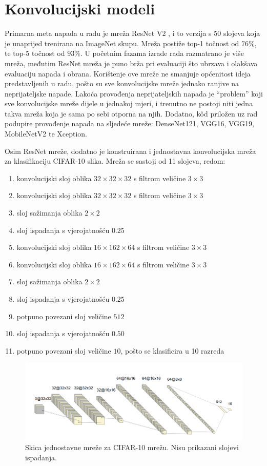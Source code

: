 \documentclass[utf8, diplomski]{fer}
\begin{document}
\section{Konvolucijski modeli}\label{custom_model}
Primarna meta napada u radu je mreža ResNet V2 \citep{resnetv2}, i to verzija s 50 slojeva koja je unaprijed trenirana na ImageNet skupu. Mreža postiže top-1 točnost od $76\%$, te top-5 točnost od $93\%$.  U početnim fazama izrade rada razmatrano je više mreža, međutim ResNet mreža je puno brža pri evaluaciji što ubrzava i olakšava evaluaciju napada i obrana. Korištenje ove mreže ne smanjuje općenitost ideja predstavljenih u radu, pošto su sve konvolucijske mreže jednako ranjive na neprijateljske napade. Lakoća provođenja neprijateljskih napada je ``problem'' koji sve konvolucijske mreže dijele u jednakoj mjeri, i trenutno ne postoji niti jedna takva mreža koja je sama po sebi otporna na njih. Dodatno, kôd priložen uz rad podupire provođenje napada na sljedeće mreže: DenseNet121, VGG16, VGG19, MobileNetV2 te Xception.
\par
Osim ResNet mreže, dodatno je konstruirana i jednostavna konvolucijska mreža za klasifikaciju CIFAR-10 slika. Mreža se sastoji od 11 slojeva, redom:
\begin{enumerate}[noitemsep, label=\textbullet]
  \item konvolucijski sloj oblika $32\times32\times32$ s filtrom veličine $3\times3$
  \item konvolucijski sloj oblika $32\times32\times32$ s filtrom veličine $3\times3$
  \item sloj sažimanja oblika $2\times2$
  \item sloj ispadanja s vjerojatnošću $0.25$
  \item konvolucijski sloj oblika $16\times162\times64$ s filtrom veličine $3\times3$
  \item konvolucijski sloj oblika $16\times162\times64$ s filtrom veličine $3\times3$
  \item sloj sažimanja oblika $2\times2$
  \item sloj ispadanja s vjerojatnošću $0.25$
  \item potpuno povezani sloj veličine $512$
  \item sloj ispadanja s vjerojatnošću $0.50$
  \item potpuno povezani sloj veličine $10$, pošto se klasificira u 10 razreda
\end{enumerate}

\begin{figure}[H]
\centering
\includegraphics[width=1\textwidth,keepaspectratio]{img/other/toy_cifar10.png}
\caption{Skica jednostavne mreže za CIFAR-10 mrežu. Nisu prikazani slojevi ispadanja.}
\label{fig:toy_cifar10}
\end{figure}
\end{document}
